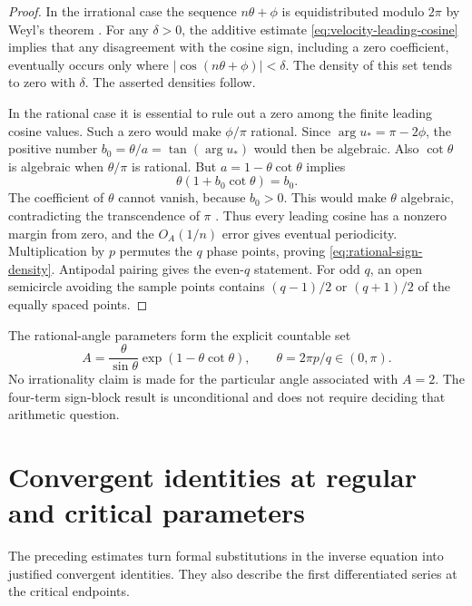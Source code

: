\begin{proof}
In the irrational case the sequence $n\theta+\phi$ is equidistributed
modulo $2\pi$ by Weyl's theorem \cite{Weyl1916}.  For any $\delta>0$, the additive estimate
\eqref{eq:velocity-leading-cosine} implies that any disagreement with
the cosine sign, including a zero coefficient, eventually occurs only
where $|\cos(n\theta+\phi)|<\delta$.  The density of this set tends to
zero with $\delta$.  The asserted densities follow.

In the rational case it is essential to rule out a zero among the finite
leading cosine values.  Such a zero would make $\phi/\pi$ rational.
Since $\arg u_*=\pi-2\phi$, the positive number
$b_0=\theta/a=\tan(\arg u_*)$ would then be algebraic.  Also
$\cot\theta$ is algebraic when $\theta/\pi$ is rational.  But
$a=1-\theta\cot\theta$ implies
\[
 \theta(1+b_0\cot\theta)=b_0.
\]
The coefficient of $\theta$ cannot vanish, because $b_0>0$.  This would
make $\theta$ algebraic, contradicting the transcendence of $\pi$ \cite{Lindemann1882}.
Thus every leading cosine has a nonzero margin from zero, and the
$O_A(1/n)$ error gives eventual periodicity.  Multiplication by $p$
permutes the $q$ phase points, proving \eqref{eq:rational-sign-density}.
Antipodal pairing gives the even-$q$ statement.  For odd $q$, an open
semicircle avoiding the sample points contains $(q-1)/2$ or $(q+1)/2$
of the equally spaced points.
\end{proof}

The rational-angle parameters form the explicit countable set
\[
 A=\frac\theta{\sin\theta}\exp(1-\theta\cot\theta),
 \qquad \theta=2\pi p/q\in(0,\pi).
\]
No irrationality claim is made for the particular angle associated with
$A=2$.  The four-term sign-block result is unconditional and does not
require deciding that arithmetic question.

\section{Convergent identities at regular and critical parameters}
\label{sec:convergent-velocity-identities}

The preceding estimates turn formal substitutions in the inverse
equation into justified convergent identities.  They also describe the
first differentiated series at the critical endpoints.

